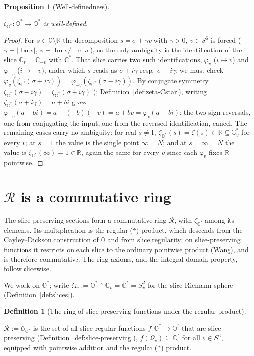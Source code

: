 \documentclass[11pt]{article}
\newcommand{\OO}{\mathbb{O}}
\newcommand{\CC}{\mathbb{C}}
\newcommand{\RR}{\mathbb{R}}
\newcommand{\Ostar}{\OO^{*}}
\newcommand{\Cstar}{\CC^{*}}
\newcommand{\zetaO}{\zeta_{\Ostar}}
\newcommand{\zetaC}{\zeta_{\Cstar}}
\DeclareMathOperator{\im}{Im}
\providecommand{\lean}[1]{}
\providecommand{\uses}[1]{}
\theoremstyle{plain}
\newtheorem{proposition}[theorem]{Proposition}
\theoremstyle{definition}
\newtheorem{definition}[theorem]{Definition}
\theoremstyle{remark}
\begin{document}
\begin{proposition}[Well-definedness]\label{prop:well-defined}
\lean{zetaO_sliceEmbed', riemannZeta_conj}
\uses{def:zeta_O, thm:riemann}
$\zetaO:\Ostar\to\Ostar$ is well-defined.
\end{proposition}
\begin{proof}
For $s\in\OO\setminus\RR$ the decomposition $s=\sigma+\gamma v$ with $\gamma>0$,
$v\in S^6$ is forced ($\gamma=|\im s|$, $v=\im s/|\im s|$), so the only ambiguity is the
identification of the slice $\CC_v=\CC_{-v}$ with $\Cstar$. That slice carries two such
identifications, $\varphi_v$ ($i\mapsto v$) and $\varphi_{-v}$ ($i\mapsto-v$), under
which $s$ reads as $\sigma+i\gamma$ resp.\ $\sigma-i\gamma$; we must check
$\varphi_v(\zetaC(\sigma+i\gamma))=\varphi_{-v}(\zetaC(\sigma-i\gamma))$. By conjugate
symmetry $\zetaC(\sigma-i\gamma)=\overline{\zetaC(\sigma+i\gamma)}$
(\cite[Ch.~2]{Titchmarsh86}; Definition~\ref{def:zeta-Cstar}), writing
$\zetaC(\sigma+i\gamma)=a+bi$ gives $\varphi_{-v}(a-bi)=a+(-b)(-v)=a+bv=\varphi_v(a+bi)$:
the two sign reversals, one from conjugating the input, one from the reversed
identification, cancel. The remaining cases carry no ambiguity: for real $s\neq1$,
$\zetaO(s)=\zeta(s)\in\RR\subseteq\CC_v^{*}$ for every $v$; at $s=1$ the value is the
single point $\infty=N$; and at $s=\infty=N$ the value is $\zetaC(\infty)=1\in\RR$, again
the same for every $v$ since each $\varphi_v$ fixes $\RR$ pointwise.
\end{proof}

\section{\texorpdfstring{$\mathcal R$}{R} is a commutative ring}\label{sec:R-ring}

The slice-preserving sections form a commutative ring $\mathcal R$, with $\zetaO$ among its elements.
Its multiplication is the regular ($\ast$) product, which descends from the Cayley--Dickson
construction of $\OO$ and from slice regularity; on slice-preserving functions it restricts on each
slice to the ordinary pointwise product (Wang), and is therefore commutative. The ring axioms, and
the integral-domain property, follow slicewise.

We work on $\Ostar$; write $\Omega_v:=\Ostar\cap\CC_v=\CC_v^{*}=S^2_v$ for the slice
Riemann sphere (Definition~\ref{def:slices}).

\begin{definition}[The ring of slice-preserving functions under the regular product]\label{def:R}
\lean{StemRing}
\uses{def:slice-preserving, def:slices}
$\mathcal R:=\mathcal O_{\Ostar}$ is the set of all slice-regular functions
$f:\Ostar\to\Ostar$ that are slice preserving (Definition~\ref{def:slice-preserving}),
$f(\Omega_v)\subseteq\CC_v^{*}$ for all $v\in S^6$, equipped with pointwise addition and
the regular ($\ast$) product.
\end{definition}
\end{document}

